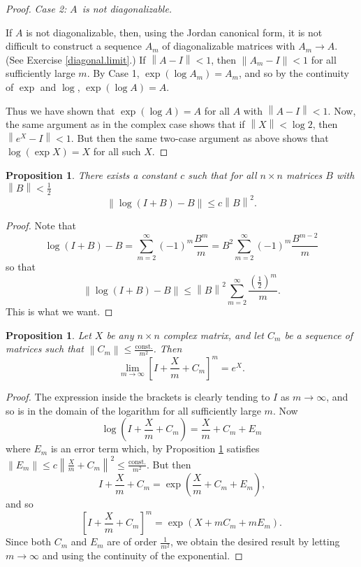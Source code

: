 \documentclass[12pt]{amsbook}
\theoremstyle{plain}
\newtheorem{proposition}[theorem]{Proposition}
\numberwithin{equation}{chapter}
\numberwithin{theorem}{chapter}
\begin{document}
\begin{proof}
\textit{Case 2: }$A$\textit{\ is not diagonalizable.}

If $A$ is not diagonalizable, then, using the Jordan canonical form, it is not
difficult to construct a sequence $A_{m}$ of diagonalizable matrices with
$A_{m}\rightarrow A$. (See Exercise \ref{diagonal.limit}.) If $\left\|
A-I\right\|  <1$, then $\left\|  A_{m}-I\right\|  <1$ for all sufficiently
large $m$. By Case 1, $\exp(\log A_{m})=A_{m}$, and so by the continuity of
$\exp$ and $\log$, $\exp(\log A)=A$.

Thus we have shown that $\exp(\log A)=A$ for all $A$ with $\left\|
A-I\right\|  <1$. Now, the same argument as in the complex case shows that if
$\left\|  X\right\|  <\log2$, then $\left\|  e^{X}-I\right\|  <1$. But then
the same two-case argument as above shows that $\log(\exp X)=X$ for all such
$X$.
\end{proof}

\begin{proposition}
\label{log.estimate}There exists a constant $c$ such that for all $n\times n$
matrices $B$ with $\left\|  B\right\|  <\tfrac{1}{2}$%
\[
\left\|  \log(I+B)-B\right\|  \leq c\left\|  B\right\|  ^{2}\text{.}%
\]
\end{proposition}

\begin{proof}
Note that
\[
\log(I+B)-B=\sum_{m=2}^{\infty}(-1)^{m}\frac{B_{{}}^{m}}{m}=B^{2}\sum
_{m=2}^{\infty}(-1)^{m}\frac{B_{{}}^{m-2}}{m}%
\]
so that
\[
\left\|  \log(I+B)-B\right\|  \leq\left\|  B\right\|  ^{2}\sum_{m=2}^{\infty
}\frac{\left(  \tfrac{1}{2}\right)  ^{m}}{m}\text{.}%
\]
This is what we want.
\end{proof}

\begin{proposition}
\label{limit}Let $X$ be any $n\times n$ complex matrix, and let $C_{m}$ be a
sequence of matrices such that $\left\|  C_{m}\right\|  \leq\tfrac
{\mathrm{const.}}{m^{2}}$. Then
\[
\lim_{m\rightarrow\infty}\left[  I+\frac{X}{m}+C_{m}\right]  ^{m}%
=e^{X}\text{.}%
\]
\end{proposition}

\begin{proof}
The expression inside the brackets is clearly tending to $I$ as $m\rightarrow
\infty$, and so is in the domain of the logarithm for all sufficiently large
$m$. Now
\[
\log\left(  I+\frac{X}{m}+C_{m}\right)  =\frac{X}{m}+C_{m}+E_{m}%
\]
where $E_{m}$ is an error term which, by Proposition \ref{log.estimate}
satisfies $\left\|  E_{m}\right\|  \leq c\left\|  \frac{X}{m}+C_{m}\right\|
^{2}\leq\frac{\mathrm{const.}}{m^{2}}$. But then
\[
I+\frac{X}{m}+C_{m}=\exp\left(  \frac{X}{m}+C_{m}+E_{m}\right)  \text{,}%
\]
and so
\[
\left[  I+\frac{X}{m}+C_{m}\right]  ^{m}=\exp\left(  X+mC_{m}+mE_{m}\right)
\text{.}%
\]
Since both $C_{m}$ and $E_{m}$ are of order $\tfrac{1}{m^{2}}$, we obtain the
desired result by letting $m\rightarrow\infty$ and using the continuity of the exponential.
\end{proof}
\end{document}
